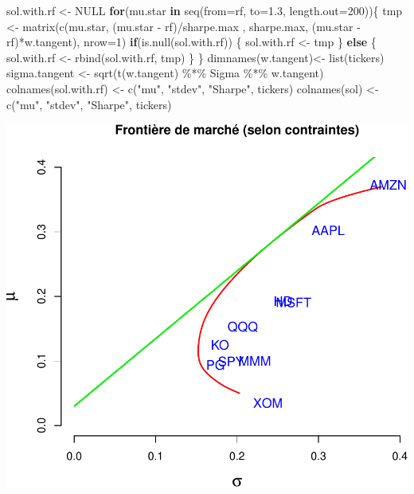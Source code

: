 \documentclass[
]{article}
\newenvironment{Shaded}{\begin{snugshade}}{\end{snugshade}}
\newcommand{\AttributeTok}[1]{\textcolor[rgb]{0.77,0.63,0.00}{#1}}
\newcommand{\ConstantTok}[1]{\textcolor[rgb]{0.00,0.00,0.00}{#1}}
\newcommand{\ControlFlowTok}[1]{\textcolor[rgb]{0.13,0.29,0.53}{\textbf{#1}}}
\newcommand{\DecValTok}[1]{\textcolor[rgb]{0.00,0.00,0.81}{#1}}
\newcommand{\FloatTok}[1]{\textcolor[rgb]{0.00,0.00,0.81}{#1}}
\newcommand{\FunctionTok}[1]{\textcolor[rgb]{0.00,0.00,0.00}{#1}}
\newcommand{\NormalTok}[1]{#1}
\newcommand{\OtherTok}[1]{\textcolor[rgb]{0.56,0.35,0.01}{#1}}
\newcommand{\SpecialCharTok}[1]{\textcolor[rgb]{0.00,0.00,0.00}{#1}}
\newcommand{\StringTok}[1]{\textcolor[rgb]{0.31,0.60,0.02}{#1}}
\begin{document}
\begin{Shaded}
\begin{Highlighting}[]
\NormalTok{sol.with.rf }\OtherTok{\textless{}{-}} \ConstantTok{NULL}
\ControlFlowTok{for}\NormalTok{(mu.star }\ControlFlowTok{in} \FunctionTok{seq}\NormalTok{(}\AttributeTok{from=}\NormalTok{rf, }\AttributeTok{to=}\FloatTok{1.3}\NormalTok{, }\AttributeTok{length.out=}\DecValTok{200}\NormalTok{))\{}
\NormalTok{  tmp }\OtherTok{\textless{}{-}} \FunctionTok{matrix}\NormalTok{(}\FunctionTok{c}\NormalTok{(mu.star, (mu.star }\SpecialCharTok{{-}}\NormalTok{ rf)}\SpecialCharTok{/}\NormalTok{sharpe.max , sharpe.max, (mu.star }\SpecialCharTok{{-}}\NormalTok{ rf)}\SpecialCharTok{*}\NormalTok{w.tangent), }\AttributeTok{nrow=}\DecValTok{1}\NormalTok{)}
  \ControlFlowTok{if}\NormalTok{(}\FunctionTok{is.null}\NormalTok{(sol.with.rf)) \{}
\NormalTok{    sol.with.rf }\OtherTok{\textless{}{-}}\NormalTok{ tmp  }
\NormalTok{  \} }\ControlFlowTok{else}\NormalTok{ \{}
\NormalTok{    sol.with.rf }\OtherTok{\textless{}{-}} \FunctionTok{rbind}\NormalTok{(sol.with.rf, tmp)}
\NormalTok{  \}}
\NormalTok{\}}
\FunctionTok{dimnames}\NormalTok{(w.tangent)}\OtherTok{\textless{}{-}} \FunctionTok{list}\NormalTok{(tickers)}
\NormalTok{sigma.tangent }\OtherTok{\textless{}{-}} \FunctionTok{sqrt}\NormalTok{(}\FunctionTok{t}\NormalTok{(w.tangent) }\SpecialCharTok{\%*\%}\NormalTok{ Sigma }\SpecialCharTok{\%*\%}\NormalTok{ w.tangent)}
\FunctionTok{colnames}\NormalTok{(sol.with.rf) }\OtherTok{\textless{}{-}} \FunctionTok{c}\NormalTok{(}\StringTok{"mu"}\NormalTok{, }\StringTok{"stdev"}\NormalTok{, }\StringTok{"Sharpe"}\NormalTok{, tickers)}
\FunctionTok{colnames}\NormalTok{(sol) }\OtherTok{\textless{}{-}} \FunctionTok{c}\NormalTok{(}\StringTok{"mu"}\NormalTok{, }\StringTok{"stdev"}\NormalTok{, }\StringTok{"Sharpe"}\NormalTok{, tickers)}
\end{Highlighting}
\end{Shaded}

\includegraphics{TP-2_files/figure-latex/unnamed-chunk-8-1.pdf}
\end{document}
